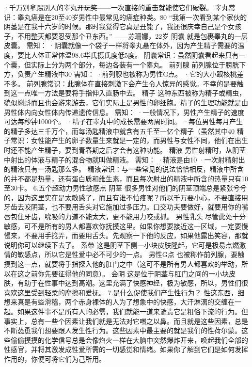 \documentclass[12pt,UTF8]{ctexbook}
\begin{document}
·千万别拿踢别人的睾丸开玩笑——一次直接的重击就能使它们破裂。
睾丸常识：睾丸癌是在20至40岁男性中最常见的癌症种类。80%
“我第一次看到某个家伙的阴茎是在我十六岁的时候。那时我觉得它真是丑毙了，我还很庆幸自己是个女孩子，不用整天都要忍受那个丑东西。”
——苏珊娜，22岁
阴囊
就是包裹睾丸的一层皮囊。
需知：
·阴囊就像一个袋子一样将睾丸悬在体外，因为产生精子需要的温度，要比人体正常体温98.6华氏摄氏度低5度。
阴囊常识：虽然阴囊看起来只有一个囊，但实际上分为两个部分，每边各装有一个睾丸。
前列腺
前列腺位于膀胱下方，负责产生精液中30%
需知：
·前列腺也被称为男性G点。
·它的大小跟核桃差不多。
前列腺常识：此腺体在直接刺激下会产生令人惊异的感觉。不幸的是要触到这一点唯一方法是要将手指伸入直肠中去。
精子
这种东西被称为精子或精虫，貌似蝌蚪而且也会游来游去，它们实际上是男性的卵细胞。精子的生理功能就是由男性体内向女性体内传递遗传信息。
需知：
·一般情况下，男性产生精子的速度可达每秒钟1000个。
·精子在睾丸中的成长需要两周时间。
·每位男性每月产生的精子多达三千万个，而每汤匙精液中就含有五千至一亿个精子（虽然其中40%
精子常识：女性能产生的卵子数量生来就是一定的，而男性与女性不同，他们在出生时还不能产生精子，要到青春期之后才会有这种功能。
精液
男性射精时，从阴茎中射出的体液与精子的混合物就叫做精液。
需知：
·精液是由10%
·一次射精射出的精液只有一汤匙那么多。
精液常识：与一些常见的说法恰恰相反，精液中所含的并不都是热量，还有蛋白质和维生素，而且每次射出的精液中所含的热量只有10至30卡。
6.五个超动力男性敏感点
阴茎
很多男性对他们的阴茎顶端总是紧张兮兮的，因为这里实在是太敏感了，而且有谁不怕疼呢？所以千万要小心，不要直接用牙齿去咬阴茎，也不要用舌头对它施加过多压力。口交功夫要做好，就要用你的嘴唇包住牙齿，吮吸的力道不能太大，更不能用力咬或抓。
男性乳头
尽管此处十分敏感，可不是所有的男人都喜欢你抚摸这里。如果你想要接近这一区域，一定要慢慢来，不要用手捻弄，而要用舌头。先观察一下他的反应，如果他露出笑容，那就说明你可以继续下去了。
系带
这是阴茎下侧一小块皮肤隆起，它可是极易点燃激情的敏感点，所以它是性爱中必不可少的一点。
男性G点
也被称作前列腺，要触摸到这一点，就要将手指探入他的肛门之中（这可不是所有男人都喜欢的举动，所以在这之前你先要征得他的同意）。
会阴
这是位于阴茎与肛门之间的一小块皮肤，有助于在性事中达到高潮。这里充满了快感神经，极为敏感，所以，男性们很喜欢这里受到轻柔的摩擦和爱抚。
7.是什么促使我们产生性行为？
性这东西，细想来真是有些滑稽，两个赤身裸体的人为了想象中的快感，大汗淋漓的交缠在一起。如果这件事不是所有人的必需，我们就能一道来谴责它是粗俗下流的行为。但事实上，总有一些个因素让我们就是无法对它嗤之以鼻。而且就是这些因素，总是不断怂恿我们想要跟人发生性行为。这些因素中最主要的就是我们的性荷尔蒙。这些偷偷摸摸的化学信号总是会像焰火一样在大脑中突然爆炸开来，唤起我们全部的性感官，并将其激发成性爱所需的一切感觉和情绪。如果你了解到它们是如何发挥作用的，你便可将它们为己所用。
\end{document}
